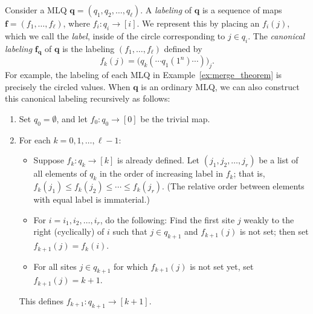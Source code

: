 \documentclass[reqno]{amsart}
\newcommand{\0}{\phantom{c}}
\newcommand{\ff}{\mathbf{f}}
\newcommand{\qq}{\mathbf{q}}
\newcommand{\tup}[1]{\left( #1 \right)}
\newcommand{\ive}[1]{\left[ #1 \right]}
\newcommand{\defn}[1]{{\color{darkred}\emph{#1}}} %
\theoremstyle{plain}
\theoremstyle{definition}
\numberwithin{equation}{section}
\begin{document}
Consider a MLQ $\qq = (q_1, q_2, \dotsc, q_{\ell})$.
A \defn{labeling} of $\qq$ is a sequence of maps $\ff = (f_1, \dotsc, f_{\ell})$, where $f_i \colon q_i \to \ive{i}$.
We represent this by placing an $f_i(j)$, which we call the \defn{label}, inside of the circle corresponding to $j \in q_i$.
The \defn{canonical labeling} $\ff_{\qq}$ of $\qq$ is the labeling $(f_1, \dotsc, f_{\ell})$ defined by
\begin{equation}
f_k(j) = \bigl( q_k( \cdots q_1(1^n) \cdots ) \bigr)_j.
\label{eq.AasLin-lab.formula}
\end{equation}
For example, the labeling of each MLQ in Example~\ref{ex:merge_theorem} is precisely the circled values.
When $\qq$ is an ordinary MLQ, we can also construct this canonical labeling recursively as follows:
\begin{enumerate}
\item Set $q_0 = \emptyset$, and let $f_0 : q_0 \to \ive{0}$ be the trivial map.
\item For each $k = 0, 1, \ldots, \ell-1$:
\begin{itemize}
\item Suppose $f_k \colon q_k \to \ive{k}$ is already defined. Let $\tup{j_1, j_2, \ldots, j_r}$ be a list of all elements of $q_k$ in the order of increasing label in $f_k$; that is, $f_k(j_1) \leq f_k(j_2) \leq \cdots \leq f_k(j_r)$.
      (The relative order between elements with equal label is immaterial.)
\item For $i = i_1, i_2, \ldots, i_r$, do the following:
      Find the first site $j$ weakly to the right (cyclically) of $i$ such that $j \in q_{k+1}$ and $f_{k+1}(j)$ is not set; then set $f_{k+1}(j) = f_k(i)$.
\item For all sites $j \in q_{k+1}$ for which $f_{k+1}(j)$ is not set yet, set $f_{k+1}(j) = k+1$.
\end{itemize}
This defines $f_{k+1} \colon q_{k+1} \to \ive{k+1}$.
\end{enumerate}
%
\end{document}
